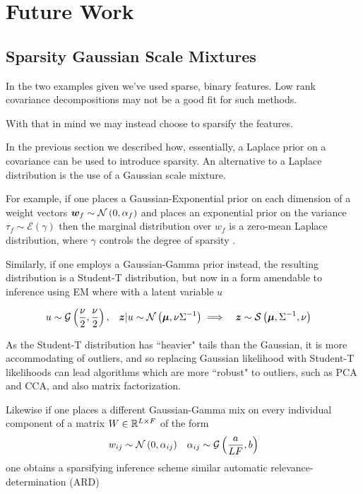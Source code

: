 

\section{Future Work}
\subsection{Sparsity Gaussian Scale Mixtures}
In the two examples given we've used sparse, binary features. Low rank covariance decompositions may not be a good fit for such methods.

With that in mind we may instead choose to sparsify the features.

In the previous section we described how, essentially, a Laplace prior on a covariance can be used to introduce sparsity. An alternative to a Laplace distribution is the use of a Gaussian scale mixture.

For example, if one places a Gaussian-Exponential prior on each dimension of a weight vectors $\bm w_f \sim \mathcal{N} \left( {0}, {\alpha_f} \right)$ and places an exponential prior on the variance $\tau_f \sim \mathcal{E}\left(\gamma\right)$ then the marginal distribution over $w_f$ is a zero-mean Laplace distribution, where $\gamma$ controls the degree of sparsity \cite{Figueiredo2003}.

Similarly, if one employs a Gaussian-Gamma prior instead, the resulting distribution is a Student-T distribution, but now in a form amendable to inference using EM where with a latent variable $u$

\begin{align}
u & \sim \mathcal{G}\left(\frac{\nu}{2}, \frac{\nu}{2} \right) ,
& \bm z|u \sim \mathcal{N} \left( {\bm \mu}, {\nu {\Sigma}^{-1}} \right) 
& \implies & \bm z & \sim \mathcal{S}\left(\bm \mu, {\Sigma}^{-1}, \nu \right)
\end{align}

As the Student-T distribution has ``heavier" tails than the Gaussian, it is more accommodating of outliers, and so replacing Gaussian likelihood with Student-T likelihoods can lead algorithms which are more ``robust" to outliers, such as PCA and CCA\cite{Archambeau2006a}, and also matrix factorization\cite{Balaji2011}.

Likewise if one places a different Gaussian-Gamma mix on every individual component of a matrix $W \in { \mathbb{R}^{L \times F} }$ of the form
\begin{align}
w_{ij} &\sim \mathcal{N} \left( {0}, {\alpha_{ij}} \right) & \alpha_{ij} \sim \mathcal{G}\left(\frac{a}{LF}, b\right)
\end{align}
one obtains a sparsifying inference scheme\cite{Archambeau2009a} similar automatic relevance-determination (ARD)

